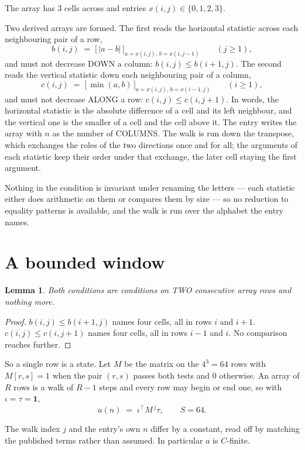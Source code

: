 \documentclass[11pt,a4paper]{article}
\theoremstyle{plain}
\newtheorem{lemma}[theorem]{Lemma}
\theoremstyle{definition}
\begin{document}
The array has $3$ cells across and entries $x(i,j)\in\{0,1,2,3\}$.

Two derived arrays are formed. The first reads the horizontal statistic across each
neighbouring pair of a row,
\[
b(i,j)\;=\;\bigl[\,\lvert a-b\rvert\,\bigr]_{a=x(i,j),\,b=x(i,j-1)}\qquad (j\ge1),
\]
and must not decrease DOWN a column: $b(i,j)\le b(i{+}1,j)$. The second reads the vertical
statistic down each neighbouring pair of a column,
\[
c(i,j)\;=\;\bigl[\,\min(a,b)\,\bigr]_{a=x(i,j),\,b=x(i{-}1,j)}\qquad (i\ge1),
\]
and must not decrease ALONG a row: $c(i,j)\le c(i,j{+}1)$. In words, the horizontal statistic
is the absolute difference of a cell and its left neighbour, and the vertical one is
the smaller of a cell and the cell above it. The entry writes the array with $n$ as the number of COLUMNS. The walk is run down the transpose, which exchanges the roles of the two directions once and for all; the arguments of each statistic keep their order under that exchange, the later cell staying the first argument.

Nothing in the condition is invariant under renaming the letters --- each statistic either does
arithmetic on them or compares them by size --- so no reduction to equality patterns is
available, and the walk is run over the alphabet the entry names.

\section{A bounded window}

\begin{lemma}\label{lem:win}
Both conditions are conditions on TWO consecutive array rows and nothing more.
\end{lemma}

\begin{proof}
$b(i,j)\le b(i{+}1,j)$ names four cells, all in rows $i$ and $i+1$. $c(i,j)\le c(i,j{+}1)$
names four cells, all in rows $i-1$ and $i$. No comparison reaches further.
\end{proof}

So a single row is a state. Let $M$ be the matrix on the $4^{3}=64$ rows with
$M[r,s]=1$ when the pair $(r,s)$ passes both tests and $0$ otherwise. An array of $R$ rows is a
walk of $R-1$ steps and every row may begin or end one, so with $\iota=\tau=\mathbf{1}$,
\[
a(n)\;=\;\iota^{\!\top}M^{\,j}\tau ,\qquad S=64.
\]

The walk index $j$ and the entry's own $n$ differ by a constant, read off by matching the
published terms rather than assumed. In particular $a$ is $C$-finite.
\end{document}
